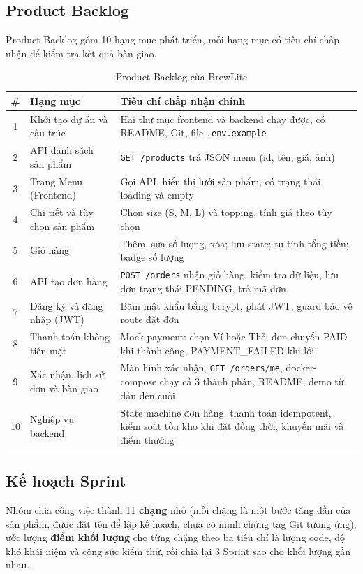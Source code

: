 \documentclass[a4paper]{article}
\begin{document}
\subsection{Product Backlog}
Product Backlog gồm 10 hạng mục phát triển, mỗi hạng mục có tiêu chí chấp nhận để kiểm tra kết quả bàn giao.
\begin{table}[h!]
\centering
\footnotesize
\begin{tabularx}{\textwidth}{|c|l|X|}
\hline
\textbf{\#} & \textbf{Hạng mục} & \textbf{Tiêu chí chấp nhận chính} \\ \hline
1 & Khởi tạo dự án và cấu trúc & Hai thư mục frontend và backend chạy được, có README, Git, file \texttt{.env.example} \\ \hline
2 & API danh sách sản phẩm & \texttt{GET /products} trả JSON menu (id, tên, giá, ảnh) \\ \hline
3 & Trang Menu (Frontend) & Gọi API, hiển thị lưới sản phẩm, có trạng thái loading và empty \\ \hline
4 & Chi tiết và tùy chọn sản phẩm & Chọn size (S, M, L) và topping, tính giá theo tùy chọn \\ \hline
5 & Giỏ hàng & Thêm, sửa số lượng, xóa; lưu state; tự tính tổng tiền; badge số lượng \\ \hline
6 & API tạo đơn hàng & \texttt{POST /orders} nhận giỏ hàng, kiểm tra dữ liệu, lưu đơn trạng thái PENDING, trả mã đơn \\ \hline
7 & Đăng ký và đăng nhập (JWT) & Băm mật khẩu bằng bcrypt, phát JWT, guard bảo vệ route đặt đơn \\ \hline
8 & Thanh toán không tiền mặt & Mock payment: chọn Ví hoặc Thẻ; đơn chuyển PAID khi thành công, PAYMENT\_FAILED khi lỗi \\ \hline
9 & Xác nhận, lịch sử đơn và bàn giao & Màn hình xác nhận, \texttt{GET /orders/me}, docker-compose chạy cả 3 thành phần, README, demo từ đầu đến cuối \\ \hline
10 & Nghiệp vụ backend & State machine đơn hàng, thanh toán idempotent, kiểm soát tồn kho khi đặt đồng thời, khuyến mãi và điểm thưởng \\ \hline
\end{tabularx}
\caption{Product Backlog của BrewLite}
\end{table}

\subsection{Kế hoạch Sprint}
Nhóm chia công việc thành 11 \textbf{chặng} nhỏ (mỗi chặng là một bước tăng dần của sản phẩm, được đặt tên để lập kế hoạch, chưa có minh chứng tag Git tương ứng), ước lượng \textbf{điểm khối lượng} cho từng chặng theo ba tiêu chí là lượng code, độ khó khái niệm và công sức kiểm thử, rồi chia lại 3 Sprint sao cho khối lượng gần nhau.
\end{document}
